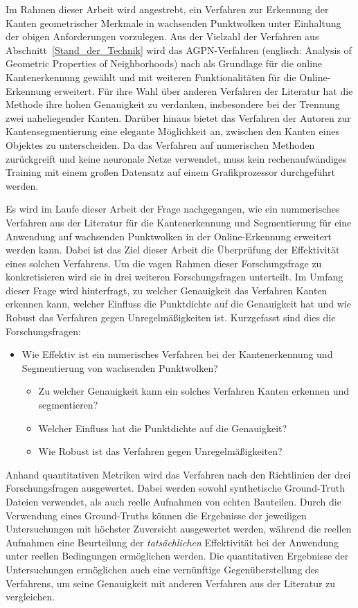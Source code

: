 Im Rahmen dieser Arbeit wird angestrebt, ein Verfahren zur Erkennung der Kanten geometrischer Merkmale in wachsenden Punktwolken unter Einhaltung der obigen Anforderungen vorzulegen. Aus der Vielzahl der Verfahren aus Abschnitt~\ref{Stand_der_Technik} wird das AGPN-Verfahren (englisch: Analysis of Geometric Properties of Neighborhoods) nach \textcite{ni_edge_2016} als Grundlage für die online Kantenerkennung gewählt und mit weiteren Funktionalitäten für die Online-Erkennung erweitert. Für ihre Wahl über anderen Verfahren der Literatur hat die Methode ihre hohen Genauigkeit zu verdanken, insbesondere bei der Trennung zwei naheliegender Kanten. Darüber hinaus bietet das Verfahren der Autoren zur Kantensegmentierung eine elegante Möglichkeit an, zwischen den Kanten eines Objektes zu unterscheiden. Da das Verfahren auf numerischen Methoden zurückgreift und keine neuronale Netze verwendet, muss kein rechenaufwändiges Training mit einem großen Datensatz auf einem Grafikprozessor durchgeführt werden.  

Es wird im Laufe dieser Arbeit der Frage nachgegangen, wie ein nummerisches Verfahren aus der Literatur für die Kantenerkennung und Segmentierung für eine Anwendung auf wachsenden Punktwolken in der Online-Erkennung erweitert werden kann. Dabei ist das Ziel dieser Arbeit die Überprüfung der Effektivität eines solchen Verfahrens. Um die vagen Rahmen dieser Forschungsfrage zu konkretisieren wird sie in drei weiteren Forschungsfragen unterteilt. Im Umfang dieser Frage wird hinterfragt, zu welcher Genauigkeit das Verfahren Kanten erkennen kann, welcher Einfluss die Punktdichte auf die Genauigkeit hat und wie Robust das Verfahren gegen Unregelmäßigkeiten ist. Kurzgefasst sind dies die Forschungsfragen:

\begin{itemize}
	\item Wie Effektiv ist ein numerisches Verfahren bei der Kantenerkennung und Segmentierung von wachsenden Punktwolken?
	\begin{itemize}
		\item Zu welcher Genauigkeit kann ein solches Verfahren Kanten erkennen und segmentieren?
		\item Welcher Einfluss hat die Punktdichte auf die Genauigkeit?
		\item Wie Robust ist das Verfahren gegen Unregelmäßigkeiten?
	\end{itemize}
\end{itemize}

Anhand quantitativen Metriken wird das Verfahren nach den Richtlinien der drei Forschungsfragen ausgewertet. Dabei werden sowohl synthetische Ground-Truth Dateien verwendet, als auch reelle Aufnahmen von echten Bauteilen. Durch die Verwendung eines Ground-Truths können die Ergebnisse der jeweiligen Untersuchungen mit höchster Zuversicht ausgewertet werden, während die reellen Aufnahmen eine Beurteilung der \textit{tatsächlichen} Effektivität bei der Anwendung unter reellen Bedingungen ermöglichen werden. Die quantitativen Ergebnisse der Untersuchungen ermöglichen auch eine vernünftige Gegenüberstellung des Verfahrens, um seine Genauigkeit mit anderen Verfahren aus der Literatur zu vergleichen. 


